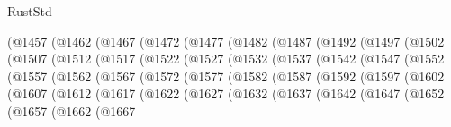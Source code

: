 \begin{lexlean}{RustStd}
\begin{coremodule}
            (@1457
              (@1462
                (@1467
                  (@1472
                    (@1477
                      (@1482
                        (@1487
                          (@1492
                            (@1497
                              (@1502
                                (@1507
                                  (@1512
                                    (@1517
                                      (@1522
                                        (@1527
                                          (@1532
                                            (@1537
                                              (@1542
                                                (@1547
                                                  (@1552
                                                    (@1557
                                                      (@1562
                                                        (@1567
                                                          (@1572
                                                            (@1577
                                                              (@1582
                                                                (@1587
                                                                  (@1592
                                                                    (@1597
                                                                      (@1602
                                                                        (@1607
                                                                          (@1612
                                                                            (@1617
                                                                              (@1622
                                                                                (@1627
                                                                                  (@1632
                                                                                    (@1637
                                                                                      (@1642
                                                                                        (@1647
                                                                                          (@1652
                                                                                            (@1657
                                                                                              (@1662
                                                                                                (@1667

\end{coremodule}
\end{lexlean}

